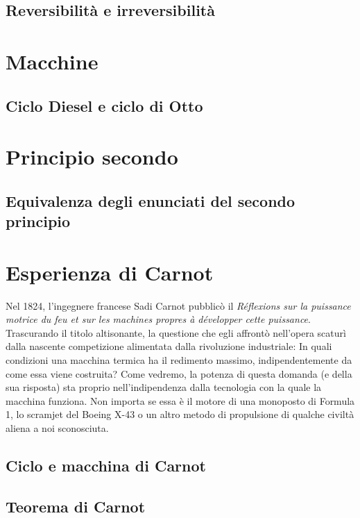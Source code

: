 \subsection{Reversibilità e irreversibilità}

\section{Macchine}

\subsection{Ciclo Diesel e ciclo di Otto}


\section{Principio secondo}

\subsection{Equivalenza degli enunciati del secondo principio}

\section{Esperienza di Carnot}
Nel 1824, l'ingegnere francese Sadi Carnot pubblicò il
\textit{Réflexions sur la puissance motrice du feu et sur les machines
propres à développer cette puissance}. Trascurando il titolo
altisonante, la questione che egli affrontò nell'opera
scaturì dalla nascente competizione alimentata dalla rivoluzione industriale:
In quali condizioni una macchina termica ha il redimento
massimo, indipendentemente da come essa viene costruita? Come
vedremo, la potenza di questa domanda (e della sua risposta) sta
proprio nell'indipendenza dalla tecnologia con la quale la
macchina funziona. Non importa se essa è il motore di una monoposto
di Formula 1, lo scramjet del Boeing X-43 o un altro metodo di
propulsione di qualche civiltà aliena a noi sconosciuta.

\subsection{Ciclo e macchina di Carnot}

\subsection{Teorema di Carnot}

